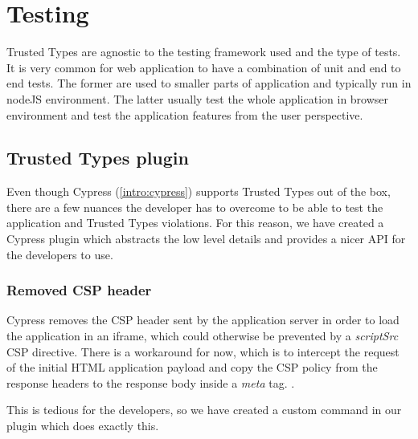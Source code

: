 \chapter{Testing}


Trusted Types are agnostic to the testing framework used and the type of tests. It is very common
for web application to have a combination of unit and end to end tests. The former are used to
smaller parts of application and typically run in nodeJS environment. The latter usually test the
whole application in browser environment and test the application features from the user
perspective.

\section{Trusted Types plugin}

Even though Cypress (\ref{intro:cypress}) supports Trusted Types out of the box, there are a few
nuances the developer has to overcome to be able to test the application and Trusted Types
violations. For this reason, we have created a Cypress plugin which abstracts the low level details
and provides a nicer API for the developers to use.

\subsection{Removed CSP header}

Cypress removes the CSP header sent by the application server in order to load the application in an
iframe, which could otherwise be prevented by a \textit{scriptSrc} CSP directive. There is a
workaround for now, which is to intercept the request of the initial HTML application payload and
copy the CSP policy from the response headers to the response body inside a \textit{meta} tag.
\cite{cypress:csp_removal_issue}.

This is tedious for the developers, so we have created a custom command in our plugin which does
exactly this.

